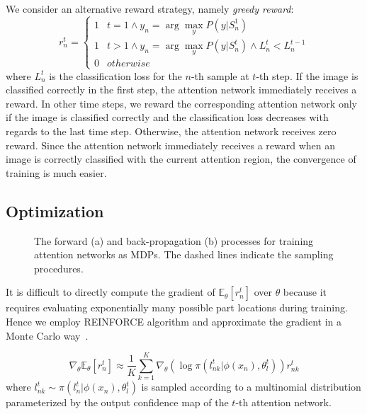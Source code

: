 \documentclass[10pt,twocolumn,letterpaper]{article}
\begin{document}
We consider an alternative reward strategy, namely {\em greedy reward}:
\begin{equation}
r^t_n=\left\{
\begin{array}{cc}
1 & t = 1 \wedge y_n = \arg\max_y P(y | S^1_n) \\
1 & t > 1 \wedge y_{n} = \arg\max_y P(y | S^t_n) \wedge L^t_n < L^{t-1}_n \\
0 & otherwise \end{array}
\right.
\end{equation}
where $L^t_n$ is the classification loss for the $n$-th sample at $t$-th step.
If the image is classified correctly in the first step, the attention network immediately receives a reward.
In other time steps, we reward the corresponding attention network only if the image is classified correctly and the classification loss decreases with regards to the last time step.
Otherwise, the attention network receives zero reward.
Since the attention network immediately receives a reward when an image is correctly classified with the current attention region, the convergence of training is much easier.

\subsection{Optimization}

\begin{figure}[t]
\begin{center}
\hspace{0.05in}
\end{center}
\caption{The forward (a) and back-propagation (b) processes for training attention networks as MDPs.
The dashed lines indicate the sampling procedures.
}
\label{fig:optimization}
\end{figure}

It is difficult to directly compute the gradient of $\mathbb{E}_{\theta}[r^t_n]$ over $\theta$ because it requires evaluating exponentially many possible part locations during training.
Hence we employ REINFORCE algorithm and approximate the gradient in a Monte Carlo way~\cite{sutton1999policy}.

\begin{equation}
\nabla_{\theta} \mathbb{E}_{\theta}[r^t_n] \approx \frac{1}{K} \sum_{k=1}^K \nabla_{\theta} \left(\log \pi(l^t_{nk} | \phi(x_n), \theta^t_l)\right) r^t_{nk}
\label{eq:policy_gradient}
\end{equation}
where $l^t_{nk}\sim \pi(l^t_n | \phi(x_n), \theta^t_l) $ is sampled according to a multinomial distribution parameterized by the output confidence map of the $t$-th attention network.
\end{document}
